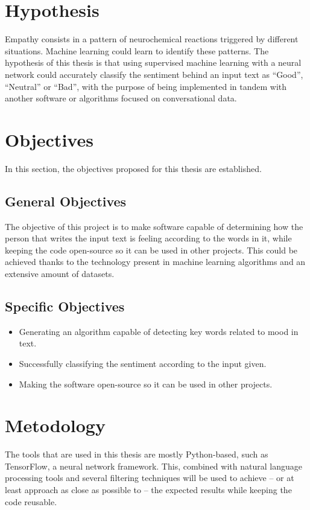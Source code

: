 \section{Hypothesis}
Empathy consists in a pattern of neurochemical reactions triggered by different situations. Machine learning could learn to identify these patterns. The hypothesis of this thesis is that using supervised machine learning with a neural network could accurately classify the sentiment behind an input text as ``Good'', ``Neutral'' or ``Bad'', with the purpose of being implemented in tandem with another software or algorithms focused on conversational data.

\section{Objectives}
In this section, the objectives proposed for this thesis are established.

\subsection{General Objectives}
The objective of this project is to make software capable of determining how the person that writes the input text is feeling according to the words in it, while keeping the code open-source so it can be used in other projects. This could be achieved thanks to the technology present in machine learning algorithms and an extensive amount of datasets.

\subsection{Specific Objectives}
\begin{itemize}
	\item Generating an algorithm capable of detecting key words related to mood in text.
	\item Successfully classifying the sentiment according to the input given.
	\item Making the software open-source so it can be used in other projects.
\end{itemize}

\section{Metodology}
The tools that are used in this thesis are mostly Python-based, such as TensorFlow, a neural network framework. This, combined with natural language processing tools and several filtering techniques will be used to achieve -- or at least approach as close as possible to -- the expected results while keeping the code reusable.

